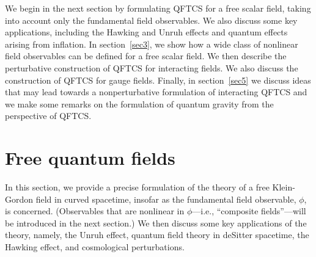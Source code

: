 \documentclass[12pt]{article}
\theoremstyle{plain}
\theoremstyle{definition}
\begin{document}
We begin in the next section by formulating QFTCS for a free scalar field, taking into account only the fundamental field observables. We also discuss some key applications, including the Hawking and Unruh effects and quantum effects arising from inflation. In section~\ref{sec3}, we show how a wide class of nonlinear field observables can be defined for a free scalar field. We then describe the perturbative construction of QFTCS for interacting fields. We also discuss the construction of QFTCS for gauge fields. Finally, in section~\ref{sec5} we discuss ideas that may lead towards a nonperturbative formulation of interacting QFTCS and we make some remarks on the formulation of quantum gravity from the perspective of QFTCS.


\section{Free quantum fields}
\label{sec2}

In this section, we provide a precise formulation of the theory of a free Klein-Gordon field in curved spacetime, insofar as the fundamental field observable, $\phi$, is concerned. (Observables that are nonlinear in $\phi$---i.e., ``composite fields''---will be introduced in the next section.) We then discuss some key applications of the theory, namely, the Unruh effect, quantum field theory in deSitter spacetime, the Hawking effect, and cosmological perturbations. 
\end{document}
